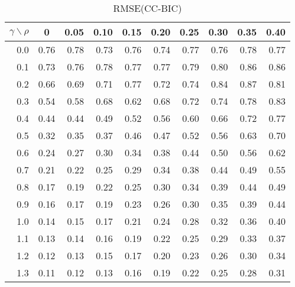 \documentclass[12pt]{article}
\begin{document}
%
\begin{table}[!tbp]
\caption{RMSE(CC-BIC)}
 \begin{center}
 \begin{tabular}{r|rrrrrrrrr}\hline\hline
\multicolumn{1}{c|}{$\gamma\backslash\rho$}&\multicolumn{1}{c}{0}&\multicolumn{1}{c}{0.05}&\multicolumn{1}{c}{0.10}&\multicolumn{1}{c}{0.15}&\multicolumn{1}{c}{0.20}&\multicolumn{1}{c}{0.25}&\multicolumn{1}{c}{0.30}&\multicolumn{1}{c}{0.35}&\multicolumn{1}{c}{0.40}\tabularnewline
\hline

0.0&0.76&0.78&0.73&0.76&0.74&0.77&0.76&0.78&0.77\tabularnewline
0.1&0.73&0.76&0.78&0.77&0.77&0.79&0.80&0.86&0.86\tabularnewline
0.2&0.66&0.69&0.71&0.77&0.72&0.74&0.84&0.87&0.81\tabularnewline
0.3&0.54&0.58&0.68&0.62&0.68&0.72&0.74&0.78&0.83\tabularnewline
0.4&0.44&0.44&0.49&0.52&0.56&0.60&0.66&0.72&0.77\tabularnewline
0.5&0.32&0.35&0.37&0.46&0.47&0.52&0.56&0.63&0.70\tabularnewline
0.6&0.24&0.27&0.30&0.34&0.38&0.44&0.50&0.56&0.62\tabularnewline
0.7&0.21&0.22&0.25&0.29&0.34&0.38&0.44&0.49&0.55\tabularnewline
0.8&0.17&0.19&0.22&0.25&0.30&0.34&0.39&0.44&0.49\tabularnewline
0.9&0.16&0.17&0.19&0.23&0.26&0.30&0.35&0.39&0.44\tabularnewline
1.0&0.14&0.15&0.17&0.21&0.24&0.28&0.32&0.36&0.40\tabularnewline
1.1&0.13&0.14&0.16&0.19&0.22&0.25&0.29&0.33&0.37\tabularnewline
1.2&0.12&0.13&0.15&0.17&0.20&0.23&0.26&0.30&0.34\tabularnewline
1.3&0.11&0.12&0.13&0.16&0.19&0.22&0.25&0.28&0.31\tabularnewline
\hline
\end{tabular}

\end{center}

\end{table}
\end{document}
